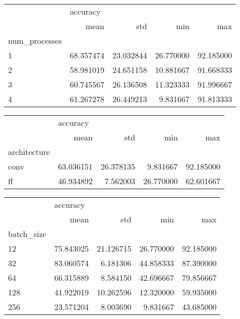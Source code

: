 \begin{tabular}{lrrrr}
\toprule
{} & \multicolumn{4}{l}{accuracy} \\
{} &       mean &        std &        min &        max \\
num\_processes &            &            &            &            \\
\midrule
1             &  68.357474 &  23.032844 &  26.770000 &  92.185000 \\
2             &  58.981019 &  24.651158 &  10.881667 &  91.668333 \\
3             &  60.745567 &  26.136508 &  11.323333 &  91.996667 \\
4             &  61.267278 &  26.449213 &   9.831667 &  91.813333 \\
\bottomrule
\end{tabular}
\begin{tabular}{lrrrr}
\toprule
{} & \multicolumn{4}{l}{accuracy} \\
{} &       mean &        std &        min &        max \\
architecture &            &            &            &            \\
\midrule
conv         &  63.036151 &  26.378135 &   9.831667 &  92.185000 \\
ff           &  46.934892 &   7.562003 &  26.770000 &  62.601667 \\
\bottomrule
\end{tabular}
\begin{tabular}{lrrrr}
\toprule
{} & \multicolumn{4}{l}{accuracy} \\
{} &       mean &        std &        min &        max \\
batch\_size &            &            &            &            \\
\midrule
12         &  75.843025 &  21.126715 &  26.770000 &  92.185000 \\
32         &  83.060574 &   6.181306 &  44.858333 &  87.390000 \\
64         &  66.315889 &   8.584150 &  42.696667 &  79.856667 \\
128        &  41.922019 &  10.262596 &  12.320000 &  59.935000 \\
256        &  23.571204 &   8.003690 &   9.831667 &  43.685000 \\
\bottomrule
\end{tabular}
